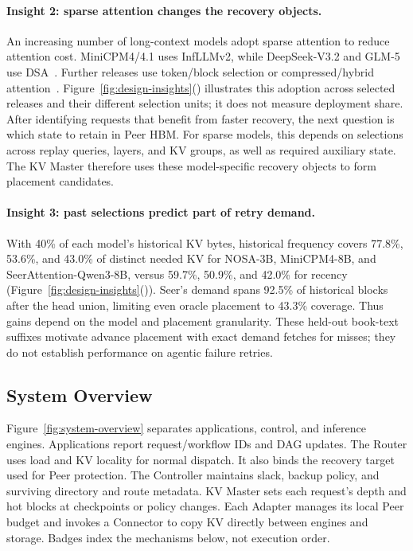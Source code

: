 \paragraph{Insight 2: sparse attention changes the recovery objects.}
An increasing number of long-context models adopt sparse attention
to reduce attention cost. MiniCPM4/4.1 uses InfLLMv2, while
DeepSeek-V3.2 and GLM-5 use DSA~\cite{minicpm4model,
openbmb2025minicpm41,deepseek2025v32exp,deepseek2025v32model,
zai2026glm5model}. Further releases use token/block selection or
compressed/hybrid attention~\cite{openbmb2026sala,
deepseek2026v4model,minimax2026m3,zai2026glm52,longcat2026sparse}.
Figure~\ref{fig:design-insights}()
illustrates this adoption across selected releases and their different
selection units; it does not measure deployment share.
After identifying requests that benefit from faster recovery, the next
question is which state to retain in Peer HBM. For sparse models, this
depends on selections across replay queries, layers, and KV groups, as
well as required auxiliary state. The KV Master therefore uses these
model-specific recovery objects to form placement candidates.

\paragraph{Insight 3: past selections predict part of retry demand.}
With 40\% of each model's historical KV bytes, historical frequency
covers 77.8\%, 53.6\%, and 43.0\% of distinct needed KV for NOSA-3B,
MiniCPM4-8B, and SeerAttention-Qwen3-8B, versus 59.7\%, 50.9\%, and
42.0\% for recency
(Figure~\ref{fig:design-insights}()).
Seer's demand spans 92.5\% of historical blocks after the head union,
limiting even oracle placement to 43.3\% coverage. Thus gains depend on
the model and placement granularity. These held-out book-text suffixes
motivate advance placement with exact demand fetches for misses;
they do not establish performance on agentic failure retries.
\subsection{System Overview}
\label{sec:system-overview}

Figure~\ref{fig:system-overview} separates applications, control, and
inference engines. Applications report request/workflow IDs and DAG
updates. The Router uses load and KV locality for normal dispatch.
It also binds the recovery target used for Peer protection. The Controller maintains
slack, backup policy, and surviving directory and route metadata.
KV Master sets each request's depth and hot blocks at checkpoints
or policy changes. Each Adapter manages its local Peer budget
and invokes a Connector to copy KV directly
between engines and storage. Badges index the mechanisms below, not
execution order.


